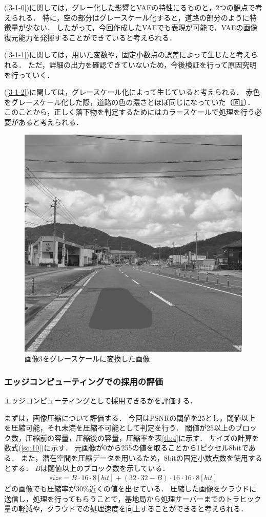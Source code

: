 \documentclass[paper]{ieicej}
\begin{document}
(\ref{3-1-0})に関しては，グレー化した影響とVAEの特性にるものと，2つの観点で考えられる．
特に，空の部分はグレースケール化すると，道路の部分のように特徴量が少ない．
したがって，今回作成したVAEでも表現が可能で，VAEの画像復元能力を発揮することができていると考えられる．

(\ref{3-1-1})に関しては，用いた変数や，固定小数点の誤差によって生じたと考えられる．
ただ，詳細の出力を確認できていないため，今後検証を行って原因究明を行っていく．

(\ref{3-1-2})に関しては，グレースケール化によって生じていると考えられる．
赤色をグレースケール化した際，道路の色の濃さとほぼ同じになっていた（図\ref{fig:3-3-5}）．
このことから，正しく落下物を判定するためにはカラースケールで処理を行う必要があると考えられる．

\begin{figure}
  \begin{center}
    \includegraphics[width=0.45\columnwidth]{figures/De_re1.png}
  \end{center}
  \caption{画像3をグレースケールに変換した画像}
  \label{fig:3-3-5}
\end{figure}

\subsubsection{エッジコンピューティングでの採用の評価}
エッジコンピューティングとして採用できるかを評価する．

まずは，画像圧縮について評価する．
今回はPSNRの閾値を25とし，閾値以上を圧縮可能，それ未満を圧縮不可能として判定を行う．
閾値が25以上のブロック数，圧縮前の容量，圧縮後の容量，圧縮率を表\ref{tb:4}に示す．
サイズの計算を数式(\ref{sq:10})に示す．
元画像が0から255の値を取ることから1ピクセル8bitである．
また，潜在空間を圧縮データを用いるため，8bitの固定小数点数を使用するとする．
$B$は閾値以上のブロック数を示している．
\begin{align}
  size = B \cdot 16 \cdot 8[bit] + (32\cdot32 - B) \cdot 16 \cdot 16 \cdot 8[bit] \label{sq:10}
\end{align}
どの画像でも圧縮率が30\%近くの値を出せている．
圧縮した画像をクラウドに送信し，処理を行ってもらうことで，基地局から処理サーバーまでのトラヒック量の軽減や，クラウドでの処理速度を向上することができると考えられる．
\end{document}
